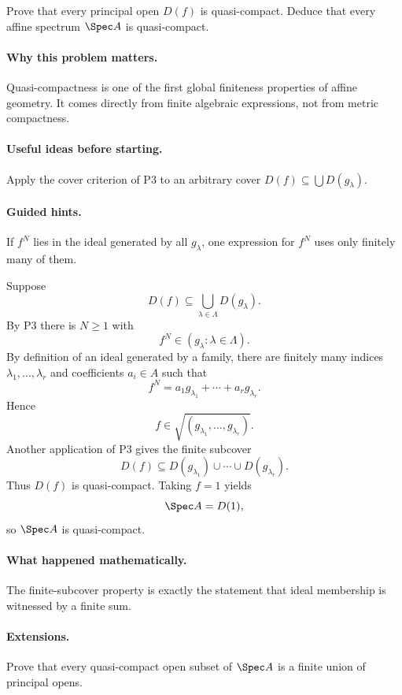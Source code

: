 \begin{problem}
Prove that every principal open $D(f)$ is quasi-compact.  Deduce that every affine spectrum
$\Spec A$ is quasi-compact.
\end{problem}

\paragraph{Why this problem matters.}
Quasi-compactness is one of the first global finiteness properties of affine geometry.  It
comes directly from finite algebraic expressions, not from metric compactness.

\paragraph{Useful ideas before starting.}
Apply the cover criterion of P3 to an arbitrary cover $D(f)\subseteq\bigcup D(g_\lambda)$.

\paragraph{Guided hints.}
If $f^N$ lies in the ideal generated by all $g_\lambda$, one expression for $f^N$ uses only
finitely many of them.

\begin{solution}
Suppose
\[
D(f)\subseteq\bigcup_{\lambda\in\Lambda}D(g_\lambda).
\]
By P3 there is $N\ge1$ with
\[
f^N\in(g_\lambda:\lambda\in\Lambda).
\]
By definition of an ideal generated by a family, there are finitely many indices
$\lambda_1,\dots,\lambda_r$ and coefficients $a_i\in A$ such that
\[
f^N=a_1g_{\lambda_1}+\cdots+a_rg_{\lambda_r}.
\]
Hence
\[
f\in\sqrt{(g_{\lambda_1},\dots,g_{\lambda_r})}.
\]
Another application of P3 gives the finite subcover
\[
D(f)\subseteq D(g_{\lambda_1})\cup\cdots\cup D(g_{\lambda_r}).
\]
Thus $D(f)$ is quasi-compact.  Taking $f=1$ yields
\[
\Spec A=D(1),
\]
so $\Spec A$ is quasi-compact.
\end{solution}

\paragraph{What happened mathematically.}
The finite-subcover property is exactly the statement that ideal membership is witnessed by
a finite sum.

\paragraph{Extensions.}
Prove that every quasi-compact open subset of $\Spec A$ is a finite union of principal opens.
